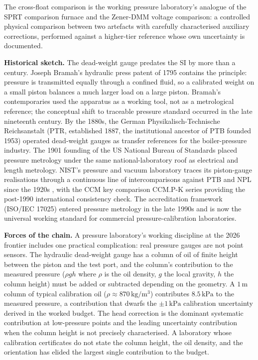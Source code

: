 The cross-float comparison is the working pressure laboratory's
analogue of the SPRT comparison furnace and the Zener-DMM
voltage comparison: a controlled physical comparison between two
artefacts with carefully characterised auxiliary corrections,
performed against a higher-tier reference whose own uncertainty
is documented.

\textbf{Historical sketch.} The dead-weight gauge predates the SI
by more than a century. Joseph Bramah's hydraulic press patent of
1795 contains the principle: pressure is transmitted equally
through a confined fluid, so a calibrated weight on a small
piston balances a much larger load on a large piston. Bramah's
contemporaries used the apparatus as a working tool, not as a
metrological reference; the conceptual shift to traceable
pressure standard occurred in the late nineteenth century. By
the 1880s, the German Physikalisch-Technische Reichsanstalt
(PTR, established 1887, the institutional ancestor of PTB
founded 1953) operated dead-weight gauges as transfer
references for the boiler-pressure industry. The 1901 founding
of the US National Bureau of Standards
\cite{hist:ch03t3-nbs-act-1901} placed pressure metrology under
the same national-laboratory roof as electrical and length
metrology. NIST's pressure and vacuum laboratory traces its
piston-gauge realisations through a continuous line of
intercomparisons against PTB and NPL since the 1920s
\cite{web:ch03t3b-nist-pressure}, with the CCM key comparison
CCM.P-K series providing the post-1990 international consistency
check. The accreditation framework (ISO/IEC 17025) entered
pressure metrology in the late 1990s and is now the universal
working standard for commercial pressure-calibration
laboratories.

\textbf{Forces of the chain.} A pressure laboratory's working
discipline at the 2026 frontier includes one practical
complication: real pressure gauges are not point sensors. The
hydraulic dead-weight gauge has a column of oil of finite height
between the piston and the test port, and the column's
contribution to the measured pressure ($\rho g h$ where $\rho$
is the oil density, $g$ the local gravity, $h$ the column
height) must be added or subtracted depending on the geometry.
A $1\,\si{\meter}$ column of typical calibration oil
($\rho \approx 870\,\si{\kilo\gram\per\meter\cubed}$) contributes
$8.5\,\si{\kilo\pascal}$ to the measured pressure, a contribution
that dwarfs the $\pm 1\,\si{\kilo\pascal}$ calibration
uncertainty derived in the worked budget. The head correction is
the dominant systematic contribution at low-pressure points and
the leading uncertainty contribution when the column height is
not precisely characterised. A laboratory whose calibration
certificates do not state the column height, the oil density,
and the orientation has elided the largest single contribution
to the budget.

